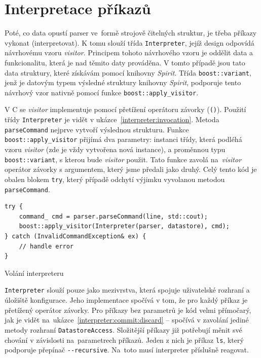 \documentclass[thesis=B,czech,hidelinks]{FITthesis}[2019/03/06]
\newcommand{\Rplus}{\protect\hspace{-.1em}\protect\raisebox{.35ex}{\smaller{\smaller\textbf{+}}}}
\newcommand{\Cpp}{\mbox{C\Rplus\Rplus}\xspace}
\begin{document}
\section{Interpretace příkazů}\label{interpreter}
Poté, co data opustí parser ve~formě strojově čitelných struktur, je třeba příkazy vykonat (interpretovat). K tomu slouží třída \texttt{Interpreter}, jejíž design odpovídá návrhovému vzoru \textit{visitor}. Principem tohoto návrhového vzoru je oddělit data a funkcionalitu, která je nad těmito daty prováděna. V tomto případě jsou tato data struktury, které získávám pomocí knihovny \textit{Spirit}. Třída \texttt{boost::variant}, jenž je datovým typem výsledné struktury knihovny \textit{Spirit}, podporuje tento návrhový vzor nativně pomocí funkce \texttt{boost::apply\_visitor}.

V \Cpp{} se \textit{visitor} implementuje pomocí přetížení operátoru závorky (\texttt{()}). Použití třídy \texttt{Interpreter} je vidět v ukázce~\ref{interpreter:invocation}. Metoda \texttt{parseCommand} nejprve vytvoří výslednou strukturu. Funkce \texttt{boost::apply\_visitor} přijímá dva parametry: instanci třídy, která podléhá vzoru \textit{visitor} (zde je vždy vytvořena nová instance), a proměnnou typu \texttt{boost::variant}, s kterou bude \textit{visitor} použit. Tato funkce zavolá na~\textit{visitor} operátor závorky s argumentem, který jsme předali jako druhý. Celý tento kód je obalen blokem \texttt{try}, který případě odchytí výjimku vyvolanou metodou \texttt{parseCommand}.

\begin{listing}
\begin{verbatim}
try {
    command_ cmd = parser.parseCommand(line, std::cout);
    boost::apply_visitor(Interpreter(parser, datastore), cmd);
} catch (InvalidCommandException& ex) {
    // handle error
}
\end{verbatim}
\caption{Volání interpreteru}\label{interpreter:invocation}
\end{listing}

\texttt{Interpreter} slouží pouze jako mezivrstva, která spojuje uživatelské rozhraní a úložiště konfigurace. Jeho implementace spočívá v tom, že pro každý příkaz je přetížený operátor závorky. Pro příkazy bez parametrů je kód velmi přímočarý, jak je vidět na~ukázce~\ref{interpreter:commit:discard} -- spočívá v zavolání jediné metody rozhraní \texttt{DatastoreAccess}. Složitější příkazy již potřebují měnit své chování v závislosti na~parametrech příkazů. Jeden z nich je příkaz \texttt{ls}, který podporuje přepínač \verb¨--recursive¨. Na~toto musí interpreter příslušně reagovat.
\end{document}

